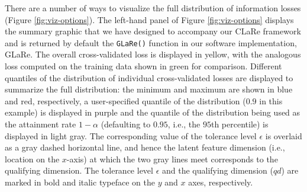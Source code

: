 
There are a number of ways to visualize the full distribution of information losses (Figure \ref{fig:viz-options}). 
The left-hand panel of Figure \ref{fig:viz-options} displays the summary graphic that we have designed to accompany our CLaRe framework and is returned by default the \texttt{GLaRe()} function in our software implementation, GLaRe.
The overall cross-validated loss is displayed in yellow, with the analogous loss computed on the training data shown in green for comparison.
Different quantiles of the distribution of individual cross-validated losses are displayed to summarize the full distribution: the minimum and maximum are shown in blue and red, respectively, a user-specified quantile of the distribution ($0.9$ in this example) is displayed in purple and the quantile of the distribution being used as the attainment rate $1 - \alpha$ (defaulting to $0.95$, i.e., the $95$th percentile) is displayed in light gray.
The corresponding value of the tolerance level $\epsilon$ is overlaid as a gray dashed horizontal line, and hence the latent feature dimension (i.e., location on the $x$-axis) at which the two gray lines meet corresponds to the qualifying dimension.
The tolerance level $\epsilon$ and the qualifying dimension ($qd$) are marked in bold and italic typeface on the $y$ and $x$ axes, respectively.

